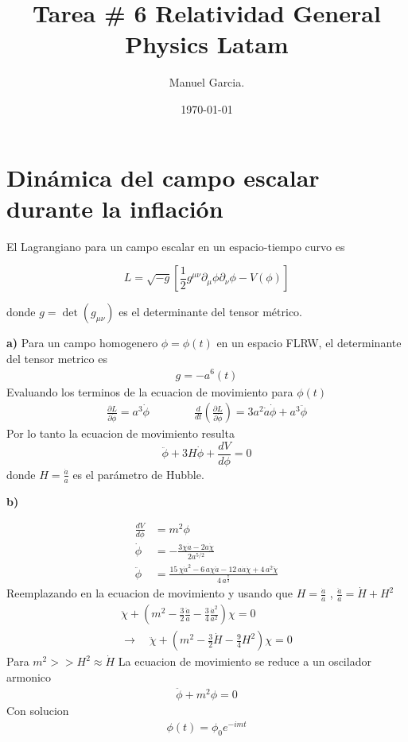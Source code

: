 \documentclass{article}
\title{Tarea \# 6 Relatividad General Physics Latam}
\author{Manuel Garcia.}
\date{\today}
\begin{document}
\maketitle


\section{Dinámica del campo escalar durante la inflación}

El Lagrangiano para un campo escalar en un espacio-tiempo curvo es

\[
L = \sqrt{-g} \left[ \frac{1}{2} g^{\mu \nu} \partial_\mu \phi \partial_\nu \phi - V(\phi) \right]
\]

donde \( g = \det(g_{\mu \nu}) \) es el determinante del tensor métrico.


\textbf{a) } Para un campo homogenero $ \phi = \phi(t) $ en un espacio FLRW, el determinante del tensor metrico es 
\begin{gather*}
  g = - a^6 (t) 
\end{gather*}
Evaluando los terminos de la ecuacion de movimiento para $ \phi(t)  $
\begin{gather*}
  \frac{\partial L  }{\partial \dot \phi }= a^3 \dot \phi \qquad \qquad \frac{d  }{d t } \left(\frac{\partial L  }{\partial \dot \phi }\right) = 3 a^2 \dot a \dot \phi + a^3 \ddot \phi
\end{gather*}
Por lo tanto la ecuacion de movimiento resulta
\[
\ddot{\phi} + 3H \dot{\phi} + \frac{dV}{d\phi} = 0
\]
donde \( H = \frac{\dot{a}}{a} \) es el parámetro de Hubble.

\hfill 


\hfill 


\hfill 

\textbf{b) }

\begin{align*}
  \frac{d V }{d \phi } &= m^2 \phi \\
  \dot \phi &= -\frac{3\chi \dot a - 2 a \dot \chi }{2 a ^ {5/2}} \\
  \ddot \phi &= \frac{15 \, \chi \dot a^2 - 6 \, a \chi \ddot a - 12 \, a \dot a \dot \chi + 4 \, a^{2} \ddot \chi }{4 \, a^{\frac{7}{2}}}
\end{align*}
Reemplazando en la ecuacion de movimiento y usando que $ H = \frac{\dot a }{a } $ , $ \frac{\ddot a }{a } = \dot H + H^2  $
\begin{gather}
  \ddot \chi + \left(m^2 - \frac{3}{2} \frac{\ddot a }{a } - \frac{3}{4} \frac{\dot a^2 }{a^2 } \right)\chi = 0 \\
  \rightarrow \quad \ddot \chi + \left(m^2 - \frac{3}{2} \dot H - \frac{9 }{4 } H^2 \right)\chi = 0
\end{gather}
Para $ m^2 >> H^2 \approx \dot H  $ La ecuacion de movimiento se reduce a un oscilador armonico 
\begin{gather}
  \ddot \phi + m^2 \phi = 0 
\end{gather}
Con solucion 
\begin{gather}
  \phi(t) = \phi_0 e ^ {- i m t }
\end{gather}
\end{document}
